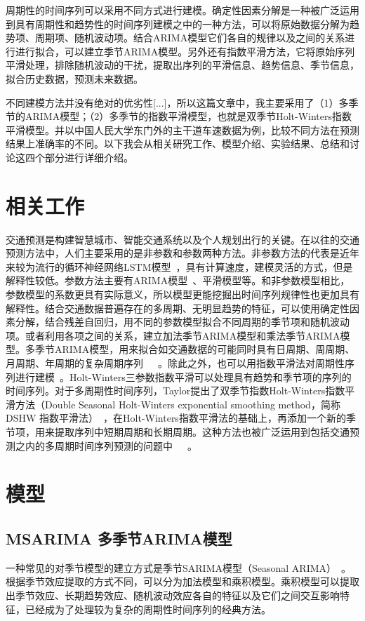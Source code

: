 \documentclass[lang=cn,11pt,a4paper]{elegantpaper}
\begin{document}
周期性的时间序列可以采用不同方式进行建模。确定性因素分解是一种被广泛运用到具有周期性和趋势性的时间序列建模之中的一种方法，可以将原始数据分解为趋势项、周期项、随机波动项。结合ARIMA模型它们各自的规律以及之间的关系进行进行拟合，可以建立季节ARIMA模型。另外还有指数平滑方法，它将原始序列平滑处理，排除随机波动的干扰，提取出序列的平滑信息、趋势信息、季节信息，拟合历史数据，预测未来数据。

不同建模方法并没有绝对的优劣性[...]，所以这篇文章中，我主要采用了（1）多季节的ARIMA模型；（2）多季节的指数平滑模型，也就是双季节Holt-Winters指数平滑模型。并以中国人民大学东门外的主干道车速数据为例，比较不同方法在预测结果上准确率的不同。以下我会从相关研究工作、模型介绍、实验结果、总结和讨论这四个部分进行详细介绍。

\section{相关工作}
交通预测是构建智慧城市、智能交通系统以及个人规划出行的关键。在以往的交通预测方法中，人们主要采用的是非参数和参数两种方法。非参数方法的代表是近年来较为流行的循环神经网络LSTM模型~\cite{ma2015long}，具有计算速度，建模灵活的方式，但是解释性较低。参数方法主要有ARIMA模型~\cite{zhang2011data}、平滑模型等。和非参数模型相比，参数模型的系数更具有实际意义，所以模型更能挖掘出时间序列规律性也更加具有解释性。结合交通数据普遍存在的多周期、无明显趋势的特征，可以使用确定性因素分解，结合残差自回归，用不同的参数模型拟合不同周期的季节项和随机波动项\cite{8892991}。或者利用各项之间的关系，建立加法季节ARIMA模型和乘法季节ARIMA模型。多季节ARIMA模型，用来拟合如交通数据的可能同时具有日周期、周周期、月周期、年周期的复杂周期序列~\cite{box2011time}~\cite{taylor2006comparison}~\cite{tran2015multiplicative}。除此之外，也可以用指数平滑法对周期性序列进行建模~\cite{ord1997estimation}。Holt-Winters三参数指数平滑可以处理具有趋势和季节项的序列的时间序列。对于多周期性时间序列，Taylor提出了双季节指数Holt-Winters指数平滑方法（Double Seasonal Holt-Winters exponential smoothing method，简称DSHW
指数平滑法）~\cite{ord1997estimation}，在Holt-Winters指数平滑法的基础上，再添加一个新的季节项，用来提取序列中短期周期和长期周期。这种方法也被广泛运用到包括交通预测之内的多周期时间序列预测的问题中~\cite{ord1997estimation}~\cite{shahin2017using}~\cite{gould2008forecasting}。

\section{模型}
\subsection{MSARIMA 多季节ARIMA模型}
一种常见的对季节模型的建立方式是季节SARIMA模型（Seasonal ARIMA）~\cite{box2011time}。根据季节效应提取的方式不同，可以分为加法模型和乘积模型。乘积模型可以提取出季节效应、长期趋势效应、随机波动效应各自的特征以及它们之间交互影响特征，已经成为了处理较为复杂的周期性时间序列的经典方法。
\end{document}
